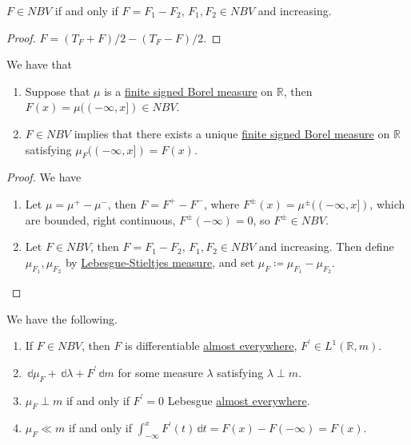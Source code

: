 \begin{corollary}
	\(F \in NBV\) if and only if \(F = F_1 - F_2\), \(F_1,F_2 \in NBV\) and increasing.
\end{corollary}
\begin{proof}
	\(F = (T_F + F)/2 - (T_F - F)/2\).
\end{proof}

\begin{theorem}\label{thm:nbv-measures}
	We have that
	\begin{enumerate}[(1)]
		\item Suppose that \(\mu\) is a \hyperref[def:finite-signed-measure]{finite signed \hyperref[def:Borel-measure]{Borel measure}}
		      on \(\mathbb{R}\), then \(F(x) = \mu((-\infty, x]) \in NBV\).
		\item \(F \in NBV\) implies that there exists a unique \hyperref[def:finite-signed-measure]{finite signed \hyperref[def:Borel-measure]{Borel measure}}
		      on \(\mathbb{R}\) satisfying \(\mu_F((-\infty,x]) = F(x)\).
	\end{enumerate}
\end{theorem}

\begin{proof}
	We have
	\begin{enumerate}[(1)]
		\item Let \(\mu = \mu^+ - \mu^-\), then \(F = F^+ - F^-\), where \(F^{\pm}(x) = \mu^{\pm}((-\infty,x])\), which are bounded,
		      right continuous, \(F^{\pm}(-\infty) = 0\), so \(F^{\pm} \in NBV\).
		\item Let \(F \in NBV\), then \(F = F_1 - F_2\), \(F_1,F_2 \in NBV\) and increasing. Then define \(\mu_{F_1},\mu_{F_2}\) by
		      \hyperref[def:Lebesgue-Stieltjes-measure]{Lebesgue-Stieltjes measure}, and set \(\mu_F \coloneqq \mu_{F_1} - \mu_{F_2}\).
	\end{enumerate}
\end{proof}

\begin{proposition}\label{prop:nbv-ftoc}
	We have the following.
	\begin{enumerate}[(1)]
		\item If \(F \in NBV\), then \(F\) is differentiable \hyperref[def:mu-almost-everywhere]{almost everywhere}, \(F^\prime  \in L^1(\mathbb{R},m)\).
		\item \(\,\mathbb{d}\mu_F + \,\mathbb{d}\lambda + F^\prime \,\mathbb{d}m\) for some measure \(\lambda\) satisfying \(\lambda \perp m\).
		\item \(\mu_F \perp m\) if and only if \(F^\prime = 0\) Lebesgue \hyperref[def:mu-almost-everywhere]{almost everywhere}.
		\item \(\mu_F \ll m\) if and only if \(\int_{-\infty}^x F^\prime (t) \,\mathbb{d}t = F(x) - F(-\infty) = F(x)\).
	\end{enumerate}
\end{proposition}

